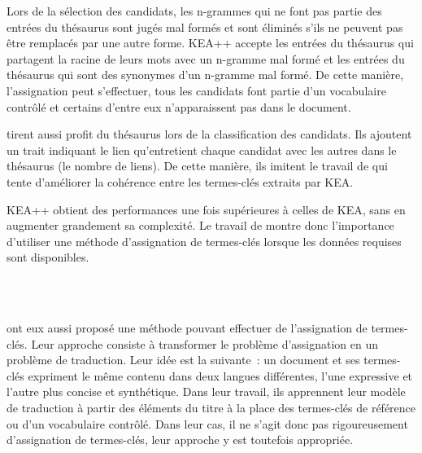     Lors de la sélection des candidats, les n-grammes qui ne font pas partie des
    entrées du thésaurus sont jugés mal formés et sont éliminés s'ils ne peuvent
    pas être remplacés par une autre forme. KEA++ accepte les entrées du
    thésaurus qui partagent la racine de leurs mots avec un n-gramme mal formé
    et les entrées du thésaurus qui sont des synonymes d'un n-gramme mal formé.
    De cette manière, l'assignation peut s'effectuer, tous les candidats font
    partie d'un vocabulaire contrôlé et certains d'entre eux n'apparaissent pas
    dans le document.

     tirent aussi profit du thésaurus lors
    de la classification des candidats. Ils ajoutent un trait indiquant le lien
    qu'entretient chaque candidat avec les autres dans le thésaurus (le nombre
    de liens). De cette manière, ils imitent le travail de
     qui tente d'améliorer la cohérence entre
    les termes-clés extraits par KEA.

    KEA++ obtient des performances une fois supérieures à celles de KEA, sans en
    augmenter grandement sa complexité. Le travail de
     montre donc l'importance d'utiliser
    une méthode d'assignation de termes-clés lorsque les données requises sont
    disponibles.

    ~\\

    ~\\ ont eux aussi proposé une méthode pouvant
    effectuer de l'assignation de termes-clés. Leur approche consiste à
    transformer le problème d'assignation en un problème de traduction. Leur
    idée est la suivante~: un document et ses termes-clés expriment le même
    contenu dans deux langues différentes, l'une expressive et l'autre plus
    concise et synthétique. Dans leur travail, ils apprennent leur modèle de
    traduction à partir des éléments du titre à la place des termes-clés de
    référence ou d'un vocabulaire contrôlé. Dans leur cas, il ne s'agit donc pas
    rigoureusement d'assignation de termes-clés, leur approche y est toutefois
    appropriée.


